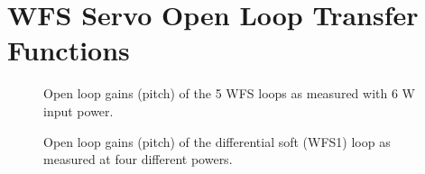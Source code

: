 \section{WFS Servo Open Loop Transfer Functions}
\label{sec:WFSolgs}

\begin{figure}
\begin{centering}
\caption{Open loop gains (pitch) of the 5 WFS loops as measured with 6 W
  input power.}
\label{fig:olgs6W}
\end{centering}
\end{figure}


\begin{figure}
\begin{centering}
\caption{Open loop gains (pitch) of the differential soft (WFS1) loop as measured at four
  different powers.}
\label{fig:DSolgs}
\end{centering}
\end{figure}


